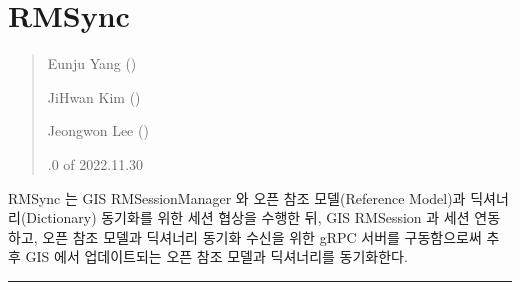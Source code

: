\documentclass[a4paper,10pt,english]{sphinxmanual}
\begin{document}
\begin{DUlineblock}{0em}
\item[] 
\end{DUlineblock}

\sphinxstepscope


\section{RMSync}
\label{\detokenize{_RMSync:rmsync}}\label{\detokenize{_RMSync:id1}}\label{\detokenize{_RMSync::doc}}\begin{quote}\begin{description}
\begin{DUlineblock}{0em}
\item[] Eunju Yang ()
\item[] JiHwan Kim ()
\item[] Jeongwon Lee ()
\end{DUlineblock}

.0 of 2022.11.30

\end{description}\end{quote}

\sphinxAtStartPar
RMSync 는 GIS RMSessionManager 와 오픈 참조 모델(Reference Model)과 딕셔너리(Dictionary) 동기화를 위한 세션 협상을 수행한 뒤,
GIS RMSession 과 세션 연동하고, 오픈 참조 모델과 딕셔너리 동기화 수신을 위한 gRPC 서버를 구동함으로써 추후 GIS 에서 업데이트되는 오픈 참조 모델과 딕셔너리를 동기화한다.



\bigskip\hrule\bigskip

\end{document}

